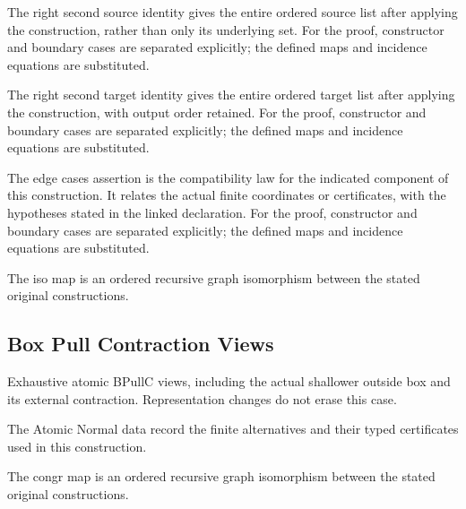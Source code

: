 The right second source identity gives the entire ordered source list after applying the construction, rather than only its underlying set.
For the proof, constructor and boundary cases are separated explicitly; the defined maps and incidence equations are substituted.
\par{}

The right second target identity gives the entire ordered target list after applying the construction, with output order retained.
For the proof, constructor and boundary cases are separated explicitly; the defined maps and incidence equations are substituted.
\par{}

The edge cases assertion is the compatibility law for the indicated component of this construction. It relates the actual finite coordinates or certificates, with the hypotheses stated in the linked declaration.
For the proof, constructor and boundary cases are separated explicitly; the defined maps and incidence equations are substituted.
\par{}

The iso map is an ordered recursive graph isomorphism between the stated original constructions.
\par{}

\subsection{Box Pull Contraction Views}
Exhaustive atomic BPullC views, including the actual shallower outside box and its external contraction. Representation changes do not erase this case.

The Atomic Normal data record the finite alternatives and their typed certificates used in this construction.
\par{}

The congr map is an ordered recursive graph isomorphism between the stated original constructions.
\par{}

